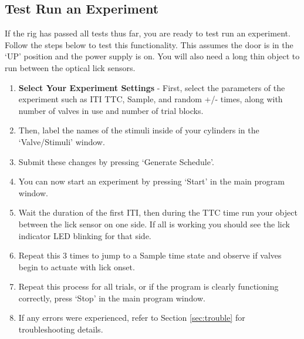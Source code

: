 \documentclass{article}
\begin{document}
\subsection{Test Run an Experiment} 
If the rig has passed all tests thus far, you are ready to test run an experiment. Follow the steps below to test this functionality. This assumes the door is in the `UP' position and
the power supply is on. You will also need a long thin object to run between the optical lick sensors.
\begin{enumerate}
    \item \textbf{Select Your Experiment Settings} - First, select the parameters of the experiment such as ITI TTC, Sample, and random +/- times, along with number of valves in use
        and number of trial blocks. 
    \item Then, label the names of the stimuli inside of your cylinders in the `Valve/Stimuli' window. 
    \item Submit these changes by pressing `Generate Schedule'. 
    \item You can now start an experiment by pressing `Start' in the main program window.
    \item Wait the duration of the first ITI, then during the TTC time run your object between the lick sensor on one side. If all is working you should see the lick 
        indicator LED blinking for that side.
    \item Repeat this 3 times to jump to a Sample time state and observe if valves begin to actuate with lick onset.
    \item Repeat this process for all trials, or if the program is clearly functioning correctly, press `Stop' in the main program window.
    \item If any errors were experienced, refer to Section \ref{sec:trouble} for troubleshooting details.
\end{enumerate}
\end{document}
